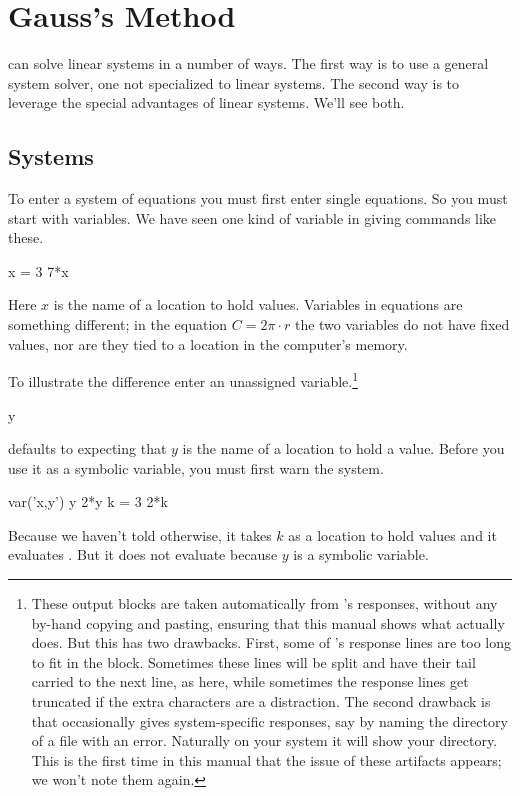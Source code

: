 \chapter{Gauss's Method}

\Sage{} can solve linear systems in a number of ways.
The first way is to use a general system solver, one not specialized to linear
systems.
The second way is to leverage the special advantages of linear systems.
We'll see both. 



\section{Systems}
To enter a system of equations you must first enter single equations.
So you must start with variables.
We have seen one kind of variable in giving commands like these.
\begin{sageoutput}
x = 3
7*x
\end{sageoutput}
Here $x$ is the name of a location to hold values.
Variables in equations are something different; in the equation
$C=2\pi\cdot r$ the two variables do not have fixed values, nor
are they tied to a location in the computer's memory. 

To illustrate the difference enter an unassigned 
variable.\footnote{These output blocks are taken automatically from 
\protect\Sage{}'s responses,
without any by-hand copying and pasting, ensuring
that this manual shows what \protect\Sage{} actually does.
But this has two drawbacks.
First, some of \protect\Sage{}'s response lines are 
too long to fit in the block.
Sometimes these lines will be split and have their tail 
carried to the next line, as here, 
while sometimes 
the response lines get truncated if the extra characters are a distraction.
The second drawback is that \protect\Sage{} occasionally gives 
system-specific responses, say by naming the directory of a file with an error.
Naturally on your system it will show your directory.
This is the first time in this manual 
that the issue of these artifacts appears; we won't note them again.}
\begin{sageoutput}[s,1,71,67;s,2,70,66]
y
\end{sageoutput}
\noindent
\Sage{} defaults to expecting that
$y$ is the name of a location to hold a value.
Before you use it as a symbolic variable, you must first
warn the system.
\begin{sageoutput}
var('x,y')
y
2*y
k = 3
2*k
\end{sageoutput}
\noindent
Because we haven't told \Sage{} otherwise, it takes $k$ as a location to hold
values and it evaluates .
But it does not evaluate  because $y$ is a symbolic variable.

